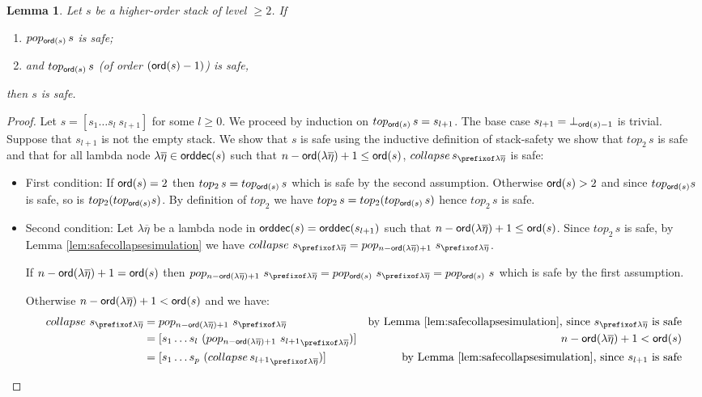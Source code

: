 \documentclass[a4paper]{article}
\newtheorem{lemma}{Lemma}[section]
\theoremstyle{remark}
\theoremstyle{definition}
\newcommand\orddec{{\sf orddec}}
\begin{document}
\begin{lemma}
\label{lem:cons_qsafety} Let $s$ be a higher-order stack of level $\geq 2$. If
\begin{enumerate}[1.]
\item $pop_{{\sf ord}(s)}\,s$ is safe;
\item and $top_{{\sf ord}(s)}\,s$ (of order $({\sf ord}(s)-1)$) is safe,
\end{enumerate}
then $s$ is safe.
\end{lemma}
\begin{proof}
Let $s = [s_1 \ldots s_l~s_{l+1}]$ for some $l\geq0$.
We proceed by induction on  $top_{{\sf ord}(s)}\,s=s_{l+1}$.
The base case $s_{l+1} = \bot_{{\sf ord}(s)-1}$ is trivial.
Suppose that $s_{l+1}$ is not the empty stack. We show that $s$ is safe using the inductive definition of stack-safety \ie we show that $top_2\,s$ is safe and that for all lambda node $\lambda \overline{\eta} \in \orddec(s)$ such that $n-{\sf ord}(\lambda \overline{\eta})+1 \leq {\sf ord}(s)$, $collapse\,s_{\prefixof \lambda \overline{\eta}}$ is safe:
\begin{itemize}
\item First condition: If ${\sf ord}(s)=2$ then $top_2\,s = top_{{\sf ord}(s)}\,s$ which is safe by the second assumption. Otherwise ${\sf ord}(s)>2$ and since $top_{{\sf ord}(s)} s$ is safe, so is $top_2(top_{{\sf ord}(s)} s)$. By definition of $top_2$ we have $top_2\,s = top_2(top_{{\sf ord}(s)}\, s)$ hence $top_2\,s$ is safe.

\item Second condition: Let $\lambda \overline{\eta}$ be a lambda node in $\orddec(s) = \orddec(s_{l+1})$ such that $n-{\sf ord}(\lambda \overline{\eta})+1 \leq {\sf ord}(s)$.
Since $top_2\,s$ is safe, by Lemma \ref{lem:safecollapsesimulation} we have
$collapse~s_{\prefixof \lambda \overline{\eta}} = pop_{n-\ord{\lambda \overline{\eta}}+1}~s_{\prefixof \lambda \overline{\eta}}$.

If $n-{\sf ord}(\lambda \overline{\eta})+1 = {\sf ord}(s)$ then
$pop_{n-\ord{\lambda \overline{\eta}}+1}~s_{\prefixof \lambda \overline{\eta}} = pop_{\ord{s}}~s_{\prefixof\lambda\overline\eta} = pop_{\ord{s}}~s$ which is safe by the first assumption.

Otherwise $n-{\sf ord}(\lambda \overline{\eta})+1 < {\sf ord}(s)$ and we have:
\begin{align*}
  collapse~s_{\prefixof\lambda\overline\eta}
      &= pop_{n-\ord{\lambda \overline{\eta}}+1}~s_{\prefixof\lambda\overline\eta}
      & \mbox{by Lemma \ref{lem:safecollapsesimulation}, since $s_{\prefixof\lambda\overline\eta}$ is safe} \\
  &= [ s_1 \ldots s_l\ (pop_{n-\ord{\lambda\overline\eta}+1}~ {s_{l+1}}_{\prefixof\lambda\overline\eta}) ]
   & \mbox{$n-\ord{\lambda \overline{\eta}}+1<\ord{s}$}  \\
  &= [s_1 \ldots s_p\ (collapse\, {s_{l+1}}_{\prefixof\lambda\overline\eta}) ]
  & \mbox{by Lemma \ref{lem:safecollapsesimulation}, since $s_{l+1}$ is safe}
\end{align*}


\end{itemize}
\end{proof}
\end{document}
